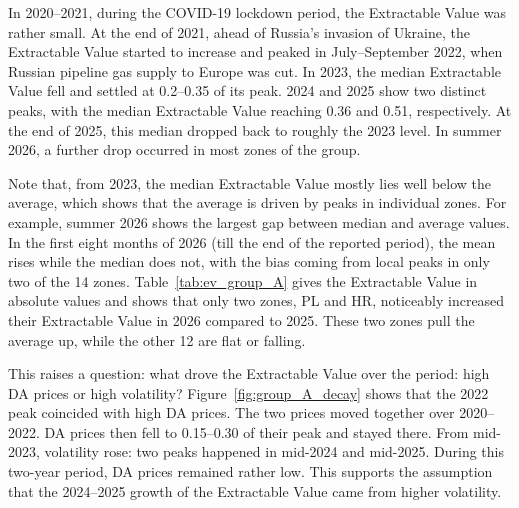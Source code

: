 \documentclass[11pt,a4paper]{article}
\begin{document}
In 2020--2021, during the COVID-19 lockdown period, the Extractable Value was rather small. At the end of 2021, ahead of Russia's invasion of Ukraine, the Extractable Value started to increase and peaked in July--September 2022, when Russian pipeline gas supply to Europe was cut. In 2023, the median Extractable Value fell and settled at 0.2--0.35 of its peak. 2024 and 2025 show two distinct peaks, with the median Extractable Value reaching 0.36 and 0.51, respectively. At the end of 2025, this median dropped back to roughly the 2023 level. In summer 2026, a further drop occurred in most zones of the group.

Note that, from 2023, the median Extractable Value mostly lies well below the average, which shows that the average is driven by peaks in individual zones. For example, summer 2026 shows the largest gap between median and average values. In the first eight months of 2026 (till the end of the reported period), the mean rises while the median does not, with the bias coming from local peaks in only two of the 14 zones. Table~\ref{tab:ev_group_A} gives the Extractable Value in absolute values and shows that only two zones, PL and HR, noticeably increased their Extractable Value in 2026 compared to 2025. These two zones pull the average up, while the other 12 are flat or falling.

This raises a question: what drove the Extractable Value over the period: high DA prices or high volatility? Figure~\ref{fig:group_A_decay} shows that the 2022 peak coincided with high DA prices. The two prices moved together over 2020--2022. DA prices then fell to 0.15--0.30 of their peak and stayed there. From mid-2023, volatility rose: two peaks happened in mid-2024 and mid-2025. During this two-year period, DA prices remained rather low. This supports the assumption that the 2024--2025 growth of the Extractable Value came from higher volatility.
\end{document}
